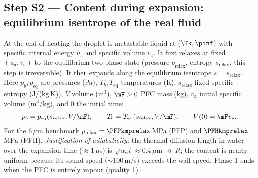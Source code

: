 \subsection{Step S2 --- Content during expansion: equilibrium isentrope of the real fluid}
At the end of heating the droplet is metastable liquid at $(\Tk,\pinf)$ with specific internal energy
$u_{\mathrm a}$ and specific volume $v_{\mathrm a}$. It first relaxes at fixed $(u_{\mathrm a},v_{\mathrm a})$ to the
equilibrium two-phase state (pressure $p_{\mathrm{relax}}$, entropy $s_{\mathrm{relax}}$; this step is
irreversible). It then expands along the equilibrium isentrope $s=s_{\mathrm{relax}}$.
Here $p_b,p_{\mathrm{eq}}$ are pressures (Pa), $T_b,T_{\mathrm{eq}}$ temperatures (K),
$s_{\mathrm{relax}}$ fixed specific entropy (J/(kg\,K)), $V$ volume (m$^3$), $\mF>0$ PFC mass
(kg), $v_{\mathrm a}$ initial specific volume (m$^3$/kg), and $0$ the initial time:
\begin{equation}
p_b=p_{\mathrm{eq}}(s_{\mathrm{relax}},V/\mF),\qquad T_b=T_{\mathrm{eq}}(s_{\mathrm{relax}},V/\mF),
\qquad V(0)=\mF v_{\mathrm a}.\label{eq:isentrope}
\end{equation}
For the 6\,$\mu$m benchmark $p_{\mathrm{relax}}=\PFPkmprelax$\,MPa (PFP) and $\PFHkmprelax$\,MPa (PFH).
\emph{Justification of adiabaticity:} the thermal diffusion length in water over the expansion time
($\approx1\,\mu$s) is $\sqrt{\alpha_{\mathrm w}t}\approx0.4\,\mu$m $\ll R$; the content is nearly uniform
because its sound speed ($\sim$100\,m/s) exceeds the wall speed. Phase 1 ends when the PFC is
entirely vapour (quality 1).

